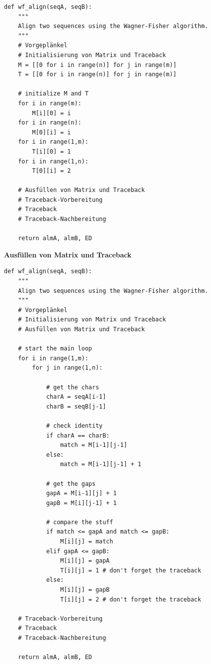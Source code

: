 \begin{verbatim}
def wf_align(seqA, seqB):
    """
    Align two sequences using the Wagner-Fisher algorithm.
    """
    # Vorgeplänkel
    # Initialisierung von Matrix und Traceback
    M = [[0 for i in range(n)] for j in range(m)]
    T = [[0 for i in range(n)] for j in range(m)]

    # initialize M and T
    for i in range(m): 
        M[i][0] = i
    for i in range(n):
        M[0][i] = i
    for i in range(1,m):
        T[i][0] = 1
    for i in range(1,n):
        T[0][i] = 2

    # Ausfüllen von Matrix und Traceback
    # Traceback-Vorbereitung
    # Traceback
    # Traceback-Nachbereitung

    return almA, almB, ED
\end{verbatim}





\vspace{0.5cm}\par\noindent\textbf{Ausfüllen von Matrix und Traceback}\vspace{0.5cm}

\begin{verbatim}
def wf_align(seqA, seqB):
    """
    Align two sequences using the Wagner-Fisher algorithm.
    """
    # Vorgeplänkel
    # Initialisierung von Matrix und Traceback
    # Ausfüllen von Matrix und Traceback

    # start the main loop
    for i in range(1,m):
        for j in range(1,n):

            # get the chars
            charA = seqA[i-1]
            charB = seqB[j-1]

            # check identity
            if charA == charB:
                match = M[i-1][j-1]
            else:
                match = M[i-1][j-1] + 1

            # get the gaps
            gapA = M[i-1][j] + 1
            gapB = M[i][j-1] + 1

            # compare the stuff
            if match <= gapA and match <= gapB:
                M[i][j] = match
            elif gapA <= gapB:
                M[i][j] = gapA
                T[i][j] = 1 # don't forget the traceback
            else:
                M[i][j] = gapB
                T[i][j] = 2 # don't forget the traceback

    # Traceback-Vorbereitung
    # Traceback
    # Traceback-Nachbereitung

    return almA, almB, ED
\end{verbatim}



